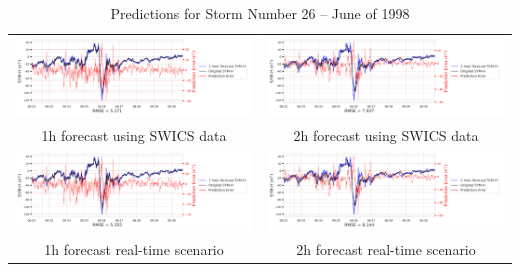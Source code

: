 \documentclass[draft,sw]{agutexSI2019}
\begin{document}
\begin{table}
\centering
\begin{tabular}{cc}
\includegraphics[width=0.49\linewidth]{paper_plots_shade/1h_swics/1h_swics_storm_26.png}
&
\includegraphics[width=0.49\linewidth]{paper_plots_shade/2h_swics/2h_swics_storm_26.png}
\\
1h forecast using SWICS data & 2h forecast using SWICS data
\vspace*{12pt}
\\
\includegraphics[width=0.49\linewidth]{paper_plots_shade/1h_rt/1h_rt_storm_26.png}
&
\includegraphics[width=0.49\linewidth]{paper_plots_shade/2h_rt/2h_rt_storm_26.png}
\\
1h forecast real-time scenario & 2h forecast real-time scenario 
\vspace*{12pt}
\\
\end{tabular}
\caption{Predictions for Storm Number 26 -- June of 1998}
\label{storm-26}
\end{table}
\end{document}
